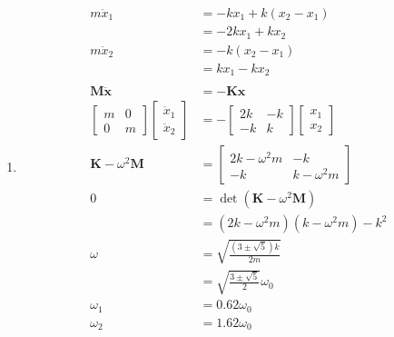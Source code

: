 \documentclass{article}
\renewcommand{\vec}[1]{\boldsymbol{\mathbf{#1}}}
\newcommand{\ddvec}[1]{\ddot{\vec{#1}}}
\begin{document}
\begin{enumerate}
  \item

        \begin{align*}
          m \ddot{x}_1                  & = -k x_1 + k (x_2 - x_1)                    \\
                                        & = -2 k x_1 + k x_2                          \\
          m \ddot{x}_2                  & = -k (x_2 - x_1)                            \\
                                        & = k x_1 - k x_2                             \\ \\
          \vec{M} \ddvec{x}             & = -\vec{K} \vec{x}                          \\
          \begin{bmatrix}
            m & 0 \\
            0 & m
          \end{bmatrix} \begin{bmatrix}
                          \ddot{x}_1 \\
                          \ddot{x}_2
                        \end{bmatrix} & = -\begin{bmatrix}
                                             2 k & -k \\
                                             -k  & k
                                           \end{bmatrix} \begin{bmatrix}
                                                           x_1 \\
                                                           x_2
                                                         \end{bmatrix}               \\
          \vec{K} - \omega^2 \vec{M}    & = \begin{bmatrix}
                                              2 k - \omega^2 m & -k             \\
                                              -k               & k - \omega^2 m
                                            \end{bmatrix}         \\
          0                             & = \det (\vec{K} - \omega^2 \vec{M})         \\
                                        & = (2 k - \omega^2 m) (k - \omega^2 m) - k^2 \\
          \omega                        & = \sqrt{\frac{ (3 \pm \sqrt{5}) k}{2 m}}    \\
                                        & = \sqrt{\frac{3 \pm \sqrt{5}}{2}} \omega_0  \\
          \omega_1                      & = 0.62 \omega_0                             \\
          \omega_2                      & = 1.62 \omega_0
        \end{align*}


\end{enumerate}
\end{document}
